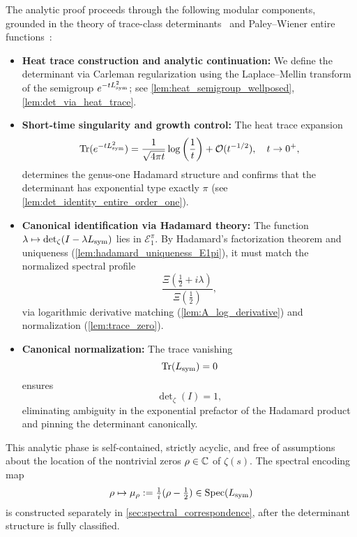 \medskip

\noindent
The analytic proof proceeds through the following modular components, grounded in the theory of trace-class determinants~\cite[Ch.~4]{Simon2005TraceIdeals} and Paley–Wiener entire functions~\cite[Ch.~9]{Levin1996EntireLectures}:

\begin{itemize}
  \item \textbf{Heat trace construction and analytic continuation:} We define the determinant via Carleman regularization using the Laplace–Mellin transform of the semigroup \( e^{-t L_{\mathrm{sym}}^2} \); see \cref{lem:heat_semigroup_wellposed}, \cref{lem:det_via_heat_trace}.

  \item \textbf{Short-time singularity and growth control:} The heat trace expansion
  \begin{equation}
  \label{eq:heat_trace_asymptotics}
  \operatorname{Tr}(e^{-t L_{\mathrm{sym}}^2}) = \frac{1}{\sqrt{4\pi t}} \log\left(\frac{1}{t}\right) + \mathcal{O}(t^{-1/2}), \quad t \to 0^+,
  \end{equation}
  determines the genus-one Hadamard structure and confirms that the determinant has exponential type exactly \( \pi \) (see \cref{lem:det_identity_entire_order_one}).

  \item \textbf{Canonical identification via Hadamard theory:} The function \( \lambda \mapsto \det_\zeta(I - \lambda L_{\mathrm{sym}}) \) lies in \( \mathcal{E}_1^\pi \). By Hadamard’s factorization theorem and uniqueness (\cref{lem:hadamard_uniqueness_E1pi}), it must match the normalized spectral profile
  \[
  \frac{\Xi(\tfrac{1}{2} + i\lambda)}{\Xi(\tfrac{1}{2})},
  \]
  via logarithmic derivative matching (\cref{lem:A_log_derivative}) and normalization (\cref{lem:trace_zero}).

  \item \textbf{Canonical normalization:} The trace vanishing
  \[
  \operatorname{Tr}(L_{\mathrm{sym}}) = 0
  \]
  ensures
  \[
  \det\nolimits_\zeta(I) = 1,
  \]
  eliminating ambiguity in the exponential prefactor of the Hadamard product and pinning the determinant canonically.
\end{itemize}

\noindent
This analytic phase is self-contained, strictly acyclic, and free of assumptions about the location of the nontrivial zeros \( \rho \in \mathbb{C} \) of \( \zeta(s) \). The spectral encoding map
\[
\rho \mapsto \mu_\rho := \tfrac{1}{i}(\rho - \tfrac{1}{2}) \in \operatorname{Spec}(L_{\mathrm{sym}})
\]
is constructed separately in \cref{sec:spectral_correspondence}, after the determinant structure is fully classified.
